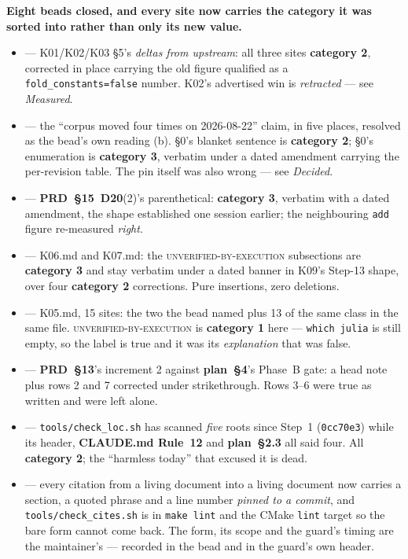 \textbf{Eight beads closed, and every site now carries the category it was
sorted into rather than only its new value.}

\begin{itemize}[leftmargin=1.5em,itemsep=2pt,topsep=4pt,parsep=0pt]
\item {} --- K01/K02/K03 §5's \emph{deltas from upstream}: all three
      sites \textbf{category 2}, corrected in place carrying the old figure
      qualified as a \texttt{fold\_constants=false} number. K02's advertised win
      is \emph{retracted} --- see \emph{Measured}.
\item {} --- the ``corpus moved four times on 2026-08-22'' claim, in five
      places, resolved as the bead's own reading (b). §0's blanket sentence is
      \textbf{category 2}; §0's enumeration is \textbf{category 3}, verbatim
      under a dated amendment carrying the per-revision table. The pin itself was
      also wrong --- see \emph{Decided}.
\item {} --- \textbf{PRD~§15~D20}(2)'s parenthetical: \textbf{category
      3}, verbatim with a dated amendment, the shape  established one
      session earlier; the neighbouring \texttt{add} figure re-measured
      \emph{right}.
\item {} --- K06.md and K07.md: the \textsc{unverified-by-execution}
      subsections are \textbf{category 3} and stay verbatim under a dated banner
      in K09's Step-13 shape, over four \textbf{category 2} corrections. Pure
      insertions, zero deletions.
\item {} --- K05.md, 15 sites: the two the bead named plus 13 of the same
      class in the same file. \textsc{unverified-by-execution} is \textbf{category
      1} here --- \texttt{which julia} is still empty, so the label is true and it
      was its \emph{explanation} that was false.
\item {} --- \textbf{PRD~§13}'s increment 2 against \textbf{plan~§4}'s
      Phase~B gate: a head note plus rows 2 and 7 corrected under strikethrough.
      Rows 3--6 were true as written and were left alone.
\item {} --- \texttt{tools/check\_loc.sh} has scanned \emph{five} roots
      since Step~1 (\texttt{0cc70e3}) while its header, \textbf{CLAUDE.md
      Rule~12} and \textbf{plan~§2.3} all said four. All \textbf{category 2}; the
      ``harmless today'' that excused it is dead.
\item {} --- every citation from a living document into a living document
      now carries a section, a quoted phrase and a line number \emph{pinned to a
      commit}, and \texttt{tools/check\_cites.sh} is in \texttt{make lint} and the
      CMake \texttt{lint} target so the bare form cannot come back. The form, its
      scope and the guard's timing are the maintainer's --- recorded in the bead
      and in the guard's own header.
\end{itemize}

